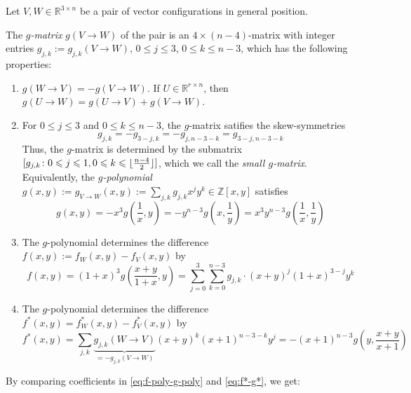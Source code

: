 \documentclass[a4paper,USenglish,cleveref, autoref, thm-restate,nolineno]{socg-lipics-v2021}
\renewcommand{\leq}{\leqslant}
\newcommand{\R}{\mathbb{R}}
\newcommand{\Z}{\mathbb{Z}}
\DeclarePairedDelimiter\floor{\lfloor}{\rfloor}
\begin{document}
\begin{theorem} 
\label{thm:f-g}
Let $V,W \in \R^{3\times n}$ be a pair of vector configurations in general position. 

The \emph{$g$-matrix} $g(V\to W)$ of the pair is an $4\times (n-4)$-matrix  with integer entries $g_{j,k}:=g_{j,k}(V\to W)$, $0\leq j\leq 3$, $0\leq k \leq n-3$, which has the following properties:  
\begin{enumerate}
\item $g(W\to V)=-g(V\to W)$. If $U\in \R^{r\times n}$, then $g(U\to W)=g(U\to V)+g(V\to W)$. 
\item For $0\leq j\leq 3$ and $0\leq k\leq n-3$, the $g$-matrix satifies the skew-symmetries
\begin{equation}
\label{eq:g-skew}
g_{j,k}=-g_{3-j,k}=-g_{j,n-3-k}=g_{3-j,n-3-k}
\end{equation}
Thus, the $g$-matrix is determined by the submatrix $[g_{j,k}\colon 0\leq j \leq 1, 0\leq k \leq \floor{\frac{n-4}{2}}]$, which we call the \emph{small $g$-matrix}. 
Equivalently, the \emph{$g$-polynomial} $g(x,y):=g_{V\to W}(x,y):=\sum_{j,k} g_{j,k} x^j y^k \in \Z[x,y]$ satisfies
\begin{equation}
\label{eq:g-poly-skew}
\textstyle g(x,y)=-x^3g(\frac{1}{x},y)=-y^{n-3}g(x,\frac{1}{y})=x^3y^{n-3}g(\frac{1}{x},\frac{1}{y})
\end{equation}
\item The $g$-polynomial determines the difference $f(x,y):=f_W(x,y)-f_V(x,y)$ by
\begin{equation}
\label{eq:f-poly-g-poly}
f(x,y) = (1+x)^3 g (\textstyle \frac{x+y}{1+x},y)=\sum_{j=0}^3 \sum_{k=0}^{n-3} g_{j,k}\cdot (x+y)^j (1+x)^{3-j} y^k
\end{equation}
\item The $g$-polynomial determines the difference $f^*(x,y)=f^*_W(x,y)-f^*_V(x,y)$ by
\begin{equation}
\label{eq:f*-g*}
\textstyle f^*(x,y) = \sum_{j,k} \underbrace{g_{j,k}(W \to V)}_{=-g_{j,k}(V \to W)} (x+y)^k (x+1)^{n-3-k} y^j = -(x+1)^{n-3} g(y,\frac{x+y}{x+1})
\end{equation}

\end{enumerate}
\end{theorem}
By comparing coefficients in \eqref{eq:f-poly-g-poly} and \eqref{eq:f*-g*}, we get:
\end{document}
